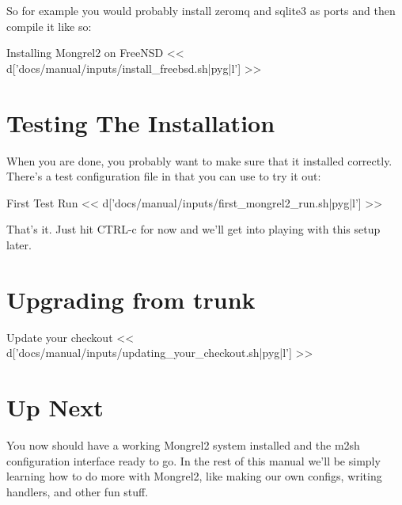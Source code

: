 So for example you would probably install zeromq and sqlite3 as ports and then compile it like so:

\begin{code}{Installing Mongrel2 on FreeNSD}
<< d['docs/manual/inputs/install_freebsd.sh|pyg|l'] >>
\end{code}

\section{Testing The Installation}

When you are done, you probably want to make sure that it installed correctly.
There's a test configuration file in  that you can
use to try it out:

\begin{code}{First Test Run}
<< d['docs/manual/inputs/first_mongrel2_run.sh|pyg|l'] >>
\end{code}

That's it.  Just hit CTRL-c for now and we'll get into playing with this
setup later.

\section{Upgrading from trunk}
\begin{code}{Update your checkout}
<< d['docs/manual/inputs/updating_your_checkout.sh|pyg|l'] >>
\end{code}



\section{Up Next}

You now should have a working Mongrel2 system installed and the m2sh configuration
interface ready to go.  In the rest of this manual we'll be simply learning how
to do more with Mongrel2, like making our own configs, writing handlers, and other
fun stuff.

